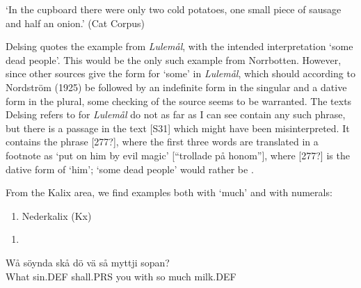 ‘In the cupboard there were only two cold potatoes, one small piece of sausage and half an onion.’ (Cat Corpus)
\z


Delsing quotes the example from \textit{Lulemål}, with the intended interpretation ‘some dead people’. This would be the only such example from Norrbotten. However, since other sources give the form  for ‘some’ in \textit{Lulemål}, which should according to Nordström (1925) be followed by an indefinite form in the singular and a dative form in the plural, some checking of the source seems to be warranted. The texts Delsing refers to for \textit{Lulemål} do not as far as I can see contain any such phrase, but there is a passage in the text [S31] which might have been misinterpreted. It contains the phrase [277?], where the first three words are translated in a footnote as ‘put on him by evil magic’ [“trollade på honom”], where [277?] is the dative form of ‘him’; ‘some dead people’ would rather be . 

From the Kalix area, we find examples both with ‘much’ and with numerals:

\begin{enumerate} %
\item 
Nederkalix (Kx) 

\end{enumerate} %
\setcounter{listLFOxcviiileveli}{0}
\begin{enumerate} %
\item 
\end{enumerate} %
Wå  söynda  skå  dö  vä  så  myttji  sopan?\\


What  sin.DEF  shall.PRS  you  with  so  much  milk.DEF\\ %


